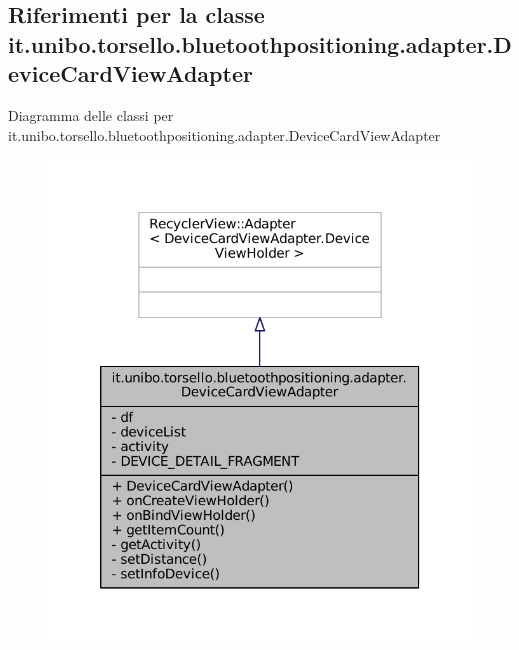 \hypertarget{classit_1_1unibo_1_1torsello_1_1bluetoothpositioning_1_1adapter_1_1DeviceCardViewAdapter}{}\subsection{Riferimenti per la classe it.\+unibo.\+torsello.\+bluetoothpositioning.\+adapter.\+Device\+Card\+View\+Adapter}
\label{classit_1_1unibo_1_1torsello_1_1bluetoothpositioning_1_1adapter_1_1DeviceCardViewAdapter}


Diagramma delle classi per it.\+unibo.\+torsello.\+bluetoothpositioning.\+adapter.\+Device\+Card\+View\+Adapter
\nopagebreak
\begin{figure}[H]
\begin{center}
\leavevmode
\includegraphics[width=320pt]{classit_1_1unibo_1_1torsello_1_1bluetoothpositioning_1_1adapter_1_1DeviceCardViewAdapter__inherit__graph}
\end{center}
\end{figure}


